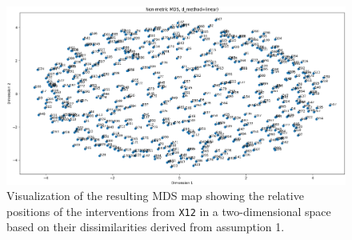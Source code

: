 \begin{figure}[ht]
    \centering
    \includegraphics[width=\textwidth]{ch3/figures/points.png}
    \caption{Visualization of the resulting MDS map showing the relative positions of the interventions from \texttt{X12} in a two-dimensional space based on their dissimilarities derived from assumption 1.}
    \label{fig:mds_map}
\end{figure}